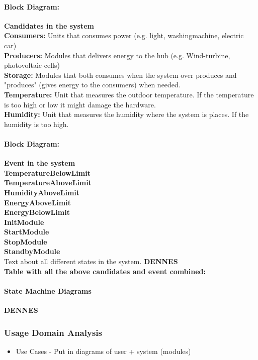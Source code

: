 			\paragraph{Block Diagram:}
				\textbf{Candidates in the system}
				\\\textbf{Consumers:} Units that consumes power (e.g. light, washingmachine, electric car)
				\\\textbf{Producers:} Modules that delivers energy to the hub (e.g. Wind-turbine, photovoltaic-cells)
				\\\textbf{Storage:} Modules that both consumes when the system over produces and "produces" (gives energy to the consumers) when needed. 
				\\\textbf{Temperature:} Unit that measures the outdoor temperature. If the temperature is too high or low it might damage the hardware.
				\\\textbf{Humidity:} Unit that measures the humidity where the system is places. If the humidity is too high.
				\newline
			\paragraph{Block Diagram:}
				\textbf{Event in the system}
				\\\textbf{TemperatureBelowLimit}
				\\\textbf{TemperatureAboveLimit}
				\\\textbf{HumidityAboveLimit}
				\\\textbf{EnergyAboveLimit}
				\\\textbf{EnergyBelowLimit}
				\\\textbf{InitModule}
				\\\textbf{StartModule}
				\\\textbf{StopModule}
				\\\textbf{StandbyModule}
				\\ Text about all different states in the system.  \textbf{DENNES}
				\\\textbf{Table with all the above candidates and event combined:}
				\newline
			\paragraph{State Machine Diagrams}
			 \textbf{DENNES}
	\subsubsection{Usage Domain Analysis}
		\begin{itemize}
			\item Use Cases - Put in diagrams of user + system (modules)
		\end{itemize}
